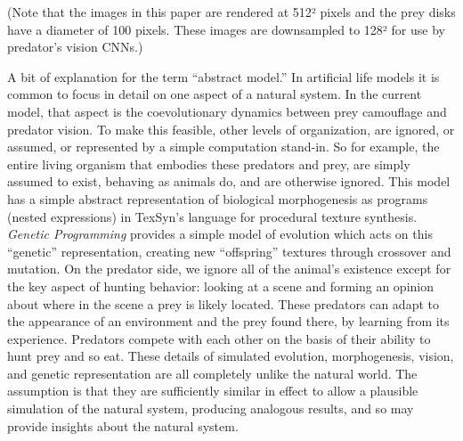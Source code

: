 \documentclass[sigconf]{acmart}
\begin{document}
\par
(Note that the images in this paper are rendered at 512² pixels and the prey disks have a diameter of 100 pixels. These images are downsampled to 128² for use by predator's vision CNNs.)
\par
A bit of explanation for the term “abstract model.” In artificial life models it is common to focus in detail on one aspect of a natural system. In the current model, that aspect is the coevolutionary dynamics between prey camouflage and predator vision. To make this feasible, other levels of organization, are ignored, or assumed, or represented by a simple computation stand-in. So for example, the entire living organism that embodies these predators and prey, are simply assumed to exist, behaving as animals do, and are otherwise ignored. This model has a simple abstract representation of biological morphogenesis as programs (nested expressions) in TexSyn's language for procedural texture synthesis. \textit{Genetic Programming} provides a simple model of evolution which acts on this “genetic” representation, creating new “offspring” textures through crossover and mutation. On the predator side, we ignore all of the animal's existence except for the key aspect of hunting behavior: looking at a scene and forming an opinion about where in the scene a prey is likely located. These predators can adapt to the appearance of an environment and the prey found there, by learning from its experience. Predators compete with each other on the basis of their ability to hunt prey and so eat. These details of simulated evolution, morphogenesis, vision, and genetic representation are all completely unlike the natural world. The assumption is that they are sufficiently similar in effect to allow a plausible simulation of the natural system, producing analogous results, and so may provide insights about the natural system.
\par

\end{document}

